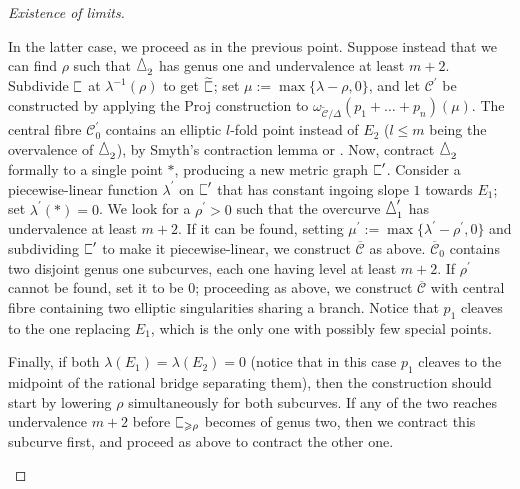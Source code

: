 \documentclass{compositio}
\newcommand{\tropC}{\scalebox{0.8}[1.3]{$\sqsubset$}}
\newcommand{\ttropC}{\widetilde{\tropC}}
\newcommand{\tropD}{\scalebox{0.9}[1.3]{$\triangle$}}
\newcommand{\tC}{\widetilde{\mathcal C}}
\newcommand{\cC}{\mathcal C}
\newcommand{\oC}{\overline{\mathcal C}}
\newcommand{\dvr}{\Delta}
\theoremstyle{plain}
\theoremstyle{definition}
\theoremstyle{remark}
\begin{document}
\begin{proof}[Existence of limits]
\begin{enumerate}
 In the latter case, we proceed as in the previous point. Suppose instead that we can find $\rho$ such that $\tropD_2$ has genus one and undervalence at least $m+2$. Subdivide $\tropC$ at $\lambda^{-1}(\rho)$ to get $\ttropC$; set $\mu:=\max\{\lambda-\rho,0\}$, and let $\cC^\prime$ be constructed by applying the Proj construction to $\omega_{\tC/\dvr}(p_1+\ldots+p_n)(\mu)$. The central fibre $\cC^\prime_0$ contains an elliptic $l$-fold point instead of $E_2$ ($l\leq m$ being the overvalence of $\tropD_2$), by Smyth's contraction lemma \cite[Lemma 2.13]{SMY1} or \cite[Proposition 3.7.6.1]{RSPW1}. Now, contract $\tropD_2$ formally to a single point $*$, producing a new metric graph $\tropC^\prime$. Consider a piecewise-linear function $\lambda^\prime$ on $\tropC^\prime$ that has constant ingoing slope $1$ towards $E_1$; set $\lambda^\prime(*)=0$. We look for a $\rho^\prime>0$ such that the overcurve $\tropD^\prime_1$ has undervalence at least $m+2$. If it can be found, setting $\mu^\prime:=\max\{\lambda^\prime-\rho^\prime,0\}$ and subdividing $\tropC^\prime$ to make it piecewise-linear, we construct $\oC$ as above. $\oC_0$ contains two disjoint genus one subcurves, each one having level at least $m+2$. If $\rho^\prime$ cannot be found, set it to be $0$; proceeding as above, we construct $\oC$ with central fibre containing two elliptic singularities sharing a branch. Notice that $p_1$ cleaves to the one replacing $E_1$, which is the only one with possibly few special points.
 
 Finally, if both $\lambda(E_1)=\lambda(E_2)=0$ (notice that in this case $p_1$ cleaves to the midpoint of the rational bridge separating them), then the construction should start by lowering $\rho$ simultaneously for both subcurves. If any of the two reaches undervalence $m+2$ before $\tropC_{\geq \rho}$ becomes of genus two, then we contract this subcurve first, and proceed as above to contract the other one.

\end{enumerate}
\end{proof}
\end{document}
